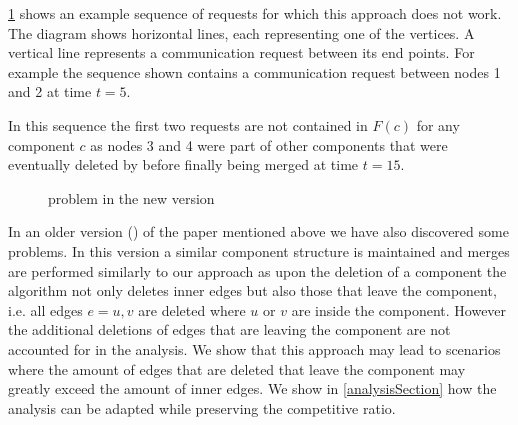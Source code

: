 \documentclass[a4paper,xcolor=dvipsnames, tikz, 12pt]{article}
\newcommand{\nl}{\newline}
\newcommand{\crep}{\text{C{\scriptsize REP}}}
\newcommand{\request}[3]{\draw (axis cs:#3,#1) -- node[left]{} (axis cs:#3,#2);}
\theoremstyle{definition}
\begin{document}
	\cref{exNewCrep} shows an example sequence of requests for which this approach does not work. The diagram shows horizontal lines, each representing one of the vertices. A vertical line represents a communication request between its end points. For example the sequence shown contains a communication request between nodes 1 and 2 at time $t=5$.
	
	In this sequence the first two requests are not contained in $F(c)$ for any component $c$ as nodes 3 and 4 were part of other components that were eventually deleted by \crep{} before finally being merged at time $t=15$.\nl
	
	\begin{figure}
		\caption{problem in the new version}\label{exNewCrep}	
	\end{figure}
	
	In an older version (\cite{Avin2015}) of the paper mentioned above we have also discovered some problems. In this version a similar component structure is maintained and merges are performed similarly to our approach as upon the deletion of a component the algorithm not only deletes inner edges but also those that leave the component, i.e. all edges $e={u,v}$ are deleted where $u$ or $v$ are inside the component. However the additional deletions of edges that are leaving the component are not accounted for in the analysis. We show that this approach may lead to scenarios where the amount of edges that are deleted that leave the component may greatly exceed the amount of inner edges. We show in \cref{analysisSection} how the analysis can be adapted while preserving the competitive ratio.
	
\end{document}
